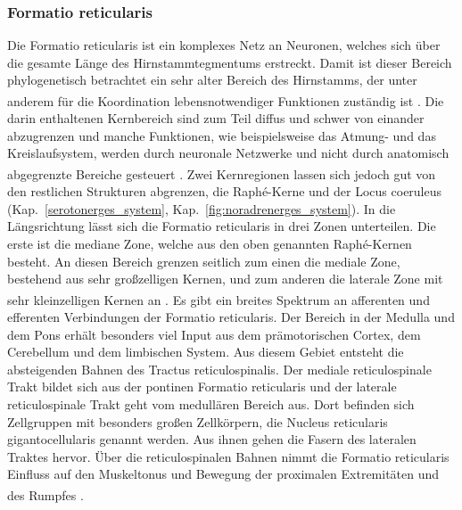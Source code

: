 \documentclass[12pt,a4paper,pdftex]{article}
\begin{document}
\subsubsection*{Formatio reticularis} 
Die Formatio reticularis ist ein komplexes Netz an Neuronen, welches sich über die gesamte Länge des Hirnstammtegmentums erstreckt. Damit ist dieser Bereich phylogenetisch betrachtet ein sehr alter Bereich des Hirnstamms, der unter anderem für die Koordination lebensnotwendiger Funktionen zuständig ist \textsuperscript{\cite[6]{trepel2011neuroanatomie}}. Die darin enthaltenen Kernbereich sind zum Teil diffus und schwer von einander abzugrenzen und manche Funktionen, wie beispielsweise das Atmung- und das Kreislaufsystem, werden durch neuronale Netzwerke und nicht durch anatomisch abgegrenzte Bereiche gesteuert \textsuperscript{\cite[9]{crossman2014neuroanatomy}}. Zwei Kernregionen lassen sich jedoch gut von den restlichen Strukturen abgrenzen, die Raphé-Kerne und der Locus coeruleus (Kap.~\ref{serotonerges_system}, Kap.~\ref{fig:noradrenerges_system}). In die Längsrichtung lässt sich die Formatio reticularis in drei Zonen unterteilen. Die erste ist die mediane Zone, welche aus den oben genannten Raphé-Kernen besteht. An diesen Bereich grenzen seitlich zum einen die mediale Zone, bestehend aus sehr großzelligen Kernen, und zum anderen die laterale Zone mit sehr kleinzelligen Kernen an \textsuperscript{\cite[6]{trepel2011neuroanatomie}}. Es gibt ein breites Spektrum an afferenten und efferenten Verbindungen der Formatio reticularis. Der Bereich in der Medulla und dem Pons erhält besonders viel Input aus dem prämotorischen Cortex, dem Cerebellum und dem limbischen System. Aus diesem Gebiet entsteht die absteigenden Bahnen des Tractus reticulospinalis. Der mediale reticulospinale Trakt bildet sich aus der pontinen Formatio reticularis und der laterale reticulospinale Trakt geht vom medullären Bereich aus. Dort befinden sich Zellgruppen mit besonders großen Zellkörpern, die Nucleus reticularis gigantocellularis genannt werden. Aus ihnen gehen die Fasern des lateralen Traktes hervor. Über die reticulospinalen Bahnen nimmt die Formatio reticularis Einfluss auf den Muskeltonus und Bewegung der proximalen Extremitäten und des Rumpfes \textsuperscript{\cite[9]{crossman2014neuroanatomy}}.
\end{document}
